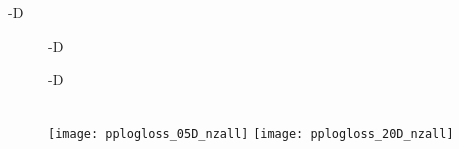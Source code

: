 \documentclass[sigconf]{acmart}
\newcommand{\bbobdatapath}{ppdata/} %
\begin{document}
{\begin{table*}
{\begin{minipage}[t]{0.499\textwidth}
\pptablefooter
\end{minipage}

\hspace{0.002\textwidth}

\begin{minipage}[t]{0.499\textwidth}
-D\\
\tiny
\pptableheader 
 




























\pptablefooter
\end{minipage}}
\vspace{1em}

\caption[Table of ERTs]{\label{tab:ERTs}
}
\end{table*}




\begin{figure}
\centering
\parbox{0.49\columnwidth}{-D}%
\parbox{0.49\columnwidth}{-D}\\
\texttt{[image: pplogloss\_05D\_nzall]}%
\texttt{[image: pplogloss\_20D\_nzall]}
%
\\

\caption{\label{tab:ERTloss}%
\bbobloglosstablecaption{}
}
\end{figure}



}
\end{document}
